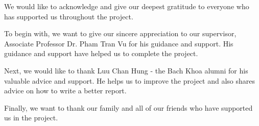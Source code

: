 We would like to acknowledge and give our deepest gratitude to everyone who has supported us throughout the project.

To begin with, we want to give our sincere appreciation to our supervisor, Associate Professor Dr. Pham Tran Vu for his guidance and support. His guidance and support have helped us to complete the project.

Next, we would like to thank Luu Chan Hung - the Bach Khoa alumni for his valuable advice and support. He helps us to improve the project and also shares advice on how to write a better report. 

Finally, we want to thank our family and all of our friends who have supported us in the project.